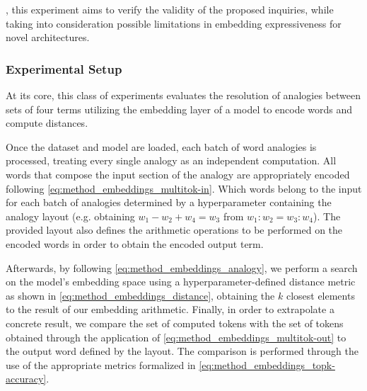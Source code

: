 , this experiment aims to verify the validity of the proposed inquiries, while taking into consideration possible limitations in embedding expressiveness for novel architectures.

\subsubsection{Experimental Setup}\label{sssec:exp_emb_exp1_expset}

At its core, this class of experiments evaluates the resolution of analogies between sets of four terms utilizing the embedding layer of a model to encode words and compute distances.

Once the dataset and model are loaded, each batch of word analogies is processed, treating every single analogy as an independent computation.
All words that compose the input section of the analogy are appropriately encoded following \cref{eq:method_embeddings_multitok-in}.
Which words belong to the input for each batch of analogies  determined by a hyperparameter containing the analogy layout (e.g. obtaining $w_1 - w_2 + w_4 = w_3$ from $w_1 : w_2 = w_3 : w_4$).
The provided layout also defines the arithmetic operations to be performed on the encoded words in order to obtain the encoded output term.

Afterwards, by following \cref{eq:method_embeddings_analogy}, we perform a search on the model's embedding space using a hyperparameter-defined distance metric as shown in \cref{eq:method_embeddings_distance}, obtaining the $k$ closest elements to the result of our embedding arithmetic.
Finally, in order to extrapolate a concrete result, we compare the set of computed tokens with the set of tokens obtained through the application of \cref{eq:method_embeddings_multitok-out} to the output word defined by the layout.
The comparison is performed through the use of the appropriate metrics formalized in \cref{eq:method_embeddings_topk-accuracy}.


